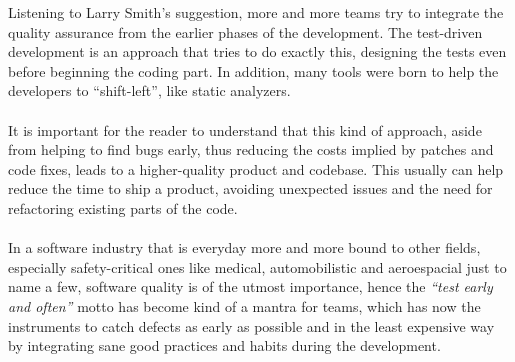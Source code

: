 Listening to Larry Smith's suggestion, more and more teams try to integrate the quality assurance from the earlier phases of the development. The test-driven development is an approach that tries to do exactly this, designing the tests even before beginning the coding part. 
In addition, many tools were born to help the developers to ``shift-left'', like static analyzers. 
\\\\
It is important for the reader to understand that this kind of approach, aside from helping to find bugs early, thus reducing the costs implied by patches and code fixes, leads to a higher-quality product and codebase. This usually can help reduce the time to ship a product, avoiding unexpected issues and the need for refactoring existing parts of the code.
\\\\
In a software industry that is everyday more and more bound to other fields, especially safety-critical ones like medical, automobilistic and aeroespacial just to name a few, software quality is of the utmost importance, hence the \emph{``test early and often''} motto has become kind of a mantra for teams, which has now the instruments to catch defects as early as possible and in the least expensive way by integrating sane good practices and habits during the development.